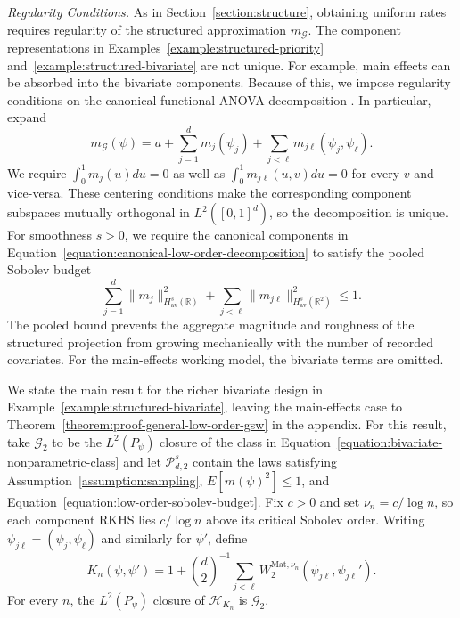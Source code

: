 \documentclass[letterpaper,12pt]{article}
\theoremstyle{definition}
\numberwithin{equation}{section}
\newcommand{\mr}{\mathbb{R}}
\newcommand{\mc}{\mathcal}
\newcommand{\norm}[1]{\lVert#1\rVert}
\begin{document}
\emph{Regularity Conditions.}
As in Section~\ref{section:structure}, obtaining uniform rates requires regularity of the structured approximation $m_{\mc G}$.
The component representations in Examples~\ref{example:structured-priority} and~\ref{example:structured-bivariate} are not unique.
For example, main effects can be absorbed into the bivariate components.
Because of this, we impose regularity conditions on the canonical functional ANOVA decomposition \citep{sobol1993}.
In particular, expand 
\begin{equation}\label{equation:canonical-low-order-decomposition}
m_{\mc G}(\psi)=a+\sum_{j=1}^dm_j(\psi_j)+\sum_{j<\ell}m_{j\ell}(\psi_j,\psi_\ell).
\end{equation}
We require $\int_0^1m_j(u)du=0$ as well as $\int_0^1m_{j\ell}(u,v)du=0$ for every $v$ and vice-versa.
These centering conditions make the corresponding component subspaces mutually orthogonal in $L^2([0,1]^d)$, so the decomposition is unique.
For smoothness $s>0$, we require the canonical components in Equation~\eqref{equation:canonical-low-order-decomposition} to satisfy the pooled Sobolev budget
\begin{equation}\label{equation:low-order-sobolev-budget}
\sum_{j=1}^d\norm{m_j}_{H_{\mathrm{av}}^s(\mr)}^2+\sum_{j<\ell}\norm{m_{j\ell}}_{H_{\mathrm{av}}^s(\mr^2)}^2\leq1.
\end{equation}
The pooled bound prevents the aggregate magnitude and roughness of the structured projection from growing mechanically with the number of recorded covariates.
For the main-effects working model, the bivariate terms are omitted.

We state the main result for the richer bivariate design in Example~\ref{example:structured-bivariate}, leaving the main-effects case to Theorem~\ref{theorem:proof-general-low-order-gsw} in the appendix.
For this result, take $\mc G_2$ to be the $L^2(P_\psi)$ closure of the class in Equation~\eqref{equation:bivariate-nonparametric-class} and let $\mc P_{d,2}^{s}$ contain the laws satisfying Assumption~\ref{assumption:sampling}, $E[m(\psi)^2]\leq1$, and Equation~\eqref{equation:low-order-sobolev-budget}.
Fix $c>0$ and set $\nu_n=c/\log n$, so each component RKHS lies $c/\log n$ above its critical Sobolev order.
Writing $\psi_{j\ell}=(\psi_j,\psi_\ell)$ and similarly for $\psi'$, define
\begin{equation*}
K_n(\psi,\psi')=1+\binom d2^{-1}\sum_{j<\ell}W_2^{\mathrm{Mat},\nu_n}(\psi_{j\ell},\psi_{j\ell}').
\end{equation*}
For every $n$, the $L^2(P_\psi)$ closure of $\mc H_{K_n}$ is $\mc G_2$.
\end{document}
